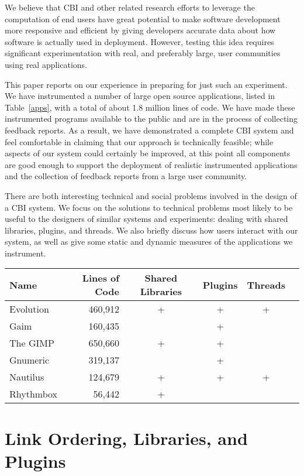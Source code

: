 \documentclass[times,10pt,twocolumn]{article}
\begin{document}
We believe that CBI and other related research efforts to leverage the 
computation of end users have great potential to make software development
more responsive and efficient by giving developers accurate data about
how software is actually used in deployment.  However, testing this idea
requires significant experimentation with real, and preferably large,
 user communities using real applications.  

This paper reports on our experience in preparing for just such an
experiment.  We have instrumented a number of large open source
applications, listed in Table~\ref{apps}, with a total of about 1.8
million lines of code. We have made these instrumented programs
available to the public and are in the process of collecting feedback
reports.  As a result, we have demonstrated a complete CBI system and
feel comfortable in claiming that our approach is technically
feasible; while aspects of our system could certainly be improved, at
this point all components are good enough to support the deployment of
realistic instrumented applications and the collection of feedback
reports from a large user community.

There are both interesting technical and social problems involved in the
design of a CBI system.  We focus on the solutions to technical problems 
most likely to be useful to the designers of similar systems and experiments:
dealing with shared libraries, plugins, and threads.  We also briefly discuss
how users interact with our system, as well as give some static and
dynamic measures of the applications we instrument.

\begin{table*}
  \centering
  \begin{tabular}{lrcccc}
    Name & Lines of Code & Shared Libraries & Plugins & Threads \\\hline
    Evolution & 460,912 & + & + & + \\
    Gaim & 160,435 & & + & \\
    The GIMP & 650,660 & + & + & \\
    Gnumeric & 319,137 & & + & \\
    Nautilus & 124,679 & + & + & + \\
    Rhythmbox & 56,442 & + & &
  \end{tabular}
  \caption{Instrumented applications}
  \label{apps}
\end{table*}


\section{Link Ordering, Libraries, and Plugins}
\end{document}
